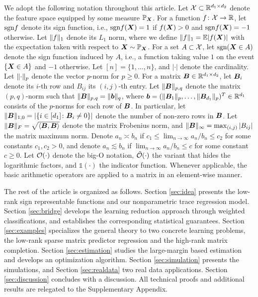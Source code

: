 \documentclass[aos]{imsart}
\theoremstyle{definition}
\def\sign{\textup{sgn}}
\begin{document}
We adopt the following notation throughout this article. Let $\mathcal{X} \subset \mathbb{R}^{d_1\times d_2}$ denote the feature space equipped by some measure $\mathbb{P}_{\bm X}$. For a function $f\colon \mathcal{X} \to \mathbb{R}$, let $\sign f$ denote its sign function, i.e., $\sign f(\mX)=1$ if $f(\bm X)>0$ and $\sign f(\mX)=-1$ otherwise. Let $\lVert f\rVert_1$ denote its $L_1$ norm, where we define $\lVert f\rVert_1=\mathbb{E}|f(\bm X)|$ with the expectation taken with respect to $\bm X \sim \mathbb{P}_{\bm X}$. For a set $A \subset \mathcal{X}$, let $\sign (\mX\in A)$ denote the sign function induced by $A$, i.e., a function taking value $1$ on the event $\{\bm X\in A\}$ and $-1$ otherwise. Let $[n] = \{1,\ldots,n\}$, and $|\cdot|$ denote the cardinality. Let $\lVert\cdot\rVert_p$ denote the vector $p$-norm for $p\geq 0$. For a matrix $\bm B \in \mathbb{R}^{d_1\times d_2}$, let $\bm B_i$ denote its $i$-th row and $B_{ij}$ its $(i,j)$-th entry. Let $\lVert\bm B\rVert_{p,q}$ denote the matrix $(p,q)$-norm such that $\lVert\bm B\rVert_{p,q}=\lVert\bm{b}\rVert_q$, where $\bm{b}=(\lVert\bm B_1\rVert_p,\ldots,\lVert\bm B_{d_1}\rVert_p)^T\in\mathbb{R}^{d_1}$ consists of the $p$-norms for each row of $\bm B$. In particular, let $\lVert\bm B\rVert_{1,0}=|\{i\in [d_1]\colon \bm B_i\neq 0\}|$ denote the number of non-zero rows in $\bm B$. Let $\lVert\bm B\rVert_F=\sqrt{\langle \bm B, \bm B \rangle}$ denote the matrix Frobenius norm, and $\lVert\bm B\rVert_\infty=\max_{(i,j)}|B_{ij}|$ the matrix maximum norm. Denote $a_n\asymp b_n$ if $c_1\leq \lim_{n\to \infty} a_n/b_n\leq c_2$ for some constants $c_1,c_2>0$, and denote $a_n\lesssim b_n$ if $\lim_{n\to\infty} a_n/b_n\leq c$ for some constant $c\geq 0$. Let $\mathcal{O}(\cdot)$ denote the big-O notation, $\tilde {\mathcal{O}}(\cdot)$ the variant that hides the logarithmic factors, and $\mathds{1}(\cdot)$ the indicator function. Whenever applicable, the basic arithmetic operators are applied to a matrix in an element-wise manner. 

The rest of the article is organized as follows. Section \ref{sec:idea} presents the low-rank sign representable functions and our nonparametric trace regression model. Section \ref{sec:bridge} develops the learning reduction approach through weighted classifications, and establishes the corresponding statistical guarantees. Section \ref{sec:examples} specializes the general theory to two concrete learning problems, the low-rank sparse matrix predictor regression and the high-rank matrix completion. Section \ref{sec:estimation} studies the large-margin based estimation and develops an optimization algorithm. Section \ref{sec:simulation} presents the simulations, and Section \ref{sec:realdata} two real data applications. Section \ref{sec:discussion} concludes with a discussion. All technical proofs and additional results are relegated to the Supplementary Appendix. 
\end{document}

